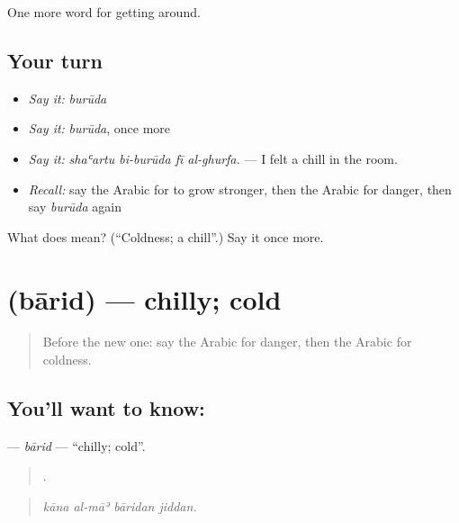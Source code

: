 \begin{grammarlens}[title={What you've built}]
One more word for getting around.
\end{grammarlens}

\subsection*{Your turn}
\begin{itemize}
\raggedright
  \item \emph{Say it:} \emph{burūda}
  \item \emph{Say it:} \emph{burūda}, once more
  \item \emph{Say it:} \emph{shaʿartu bi-burūda fī al-ghurfa.} — I felt a chill in the room.
  \item \emph{Recall:} say the Arabic for to grow stronger, then the Arabic for danger, then say \emph{burūda} again
\end{itemize}

\begin{tcolorbox}[breakable,colback=teal!4,colframe=teal!35!black,title={Before you move on}]
What does  mean? (\textquotedblleft{}Coldness; a chill\textquotedblright{}.) Say it once more.
\end{tcolorbox}
\section[\texorpdfstring{\ar{بارد} (bārid)}{بارد (bārid)}]{ (bārid) — chilly; cold}

\label{lesson:AR-C483-barid}



\begin{quote}
Before the new one: say the Arabic for danger, then the Arabic for coldness.
\end{quote}

\subsection*{You'll want to know: }
\textbf{} — \emph{bārid} — \textquotedblleft{}chilly; cold\textquotedblright{}.

\begin{quote}
   .
\end{quote}

\begin{quote}
\emph{kāna al-māʾ bāridan jiddan.}
\end{quote}

